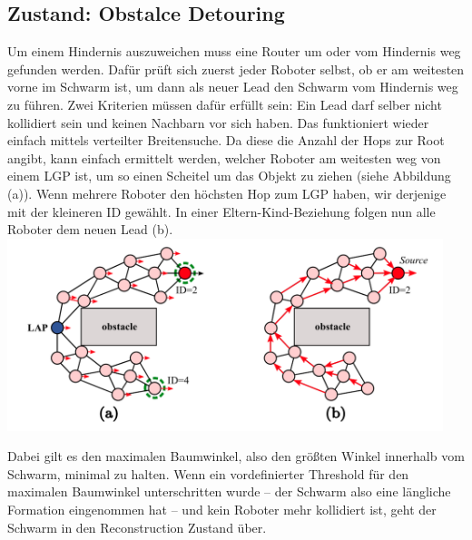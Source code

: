 \subsection{Zustand: Obstalce Detouring}

Um einem Hindernis auszuweichen muss eine Router um oder vom Hindernis weg gefunden werden. Dafür prüft
sich zuerst jeder Roboter selbst, ob er am weitesten vorne im Schwarm ist, um dann als neuer Lead den 
Schwarm vom Hindernis weg zu führen. 
Zwei Kriterien müssen dafür erfüllt sein: Ein Lead darf selber nicht kollidiert sein und keinen Nachbarn
vor sich haben.
Das funktioniert wieder einfach
mittels verteilter Breitensuche. Da diese die Anzahl der Hops zur Root angibt, kann einfach ermittelt werden,
welcher Roboter am weitesten weg von einem LGP ist, um so einen Scheitel um das Objekt zu ziehen (siehe
Abbildung (a)).
Wenn mehrere Roboter den höchsten Hop zum LGP haben, wir derjenige mit der kleineren ID
gewählt. In einer Eltern-Kind-Beziehung folgen nun alle Roboter dem neuen Lead (b).\\

\includegraphics[width=5in]{images/Screenshot 2023-02-20 at 1.25.24 PM.png}

Dabei gilt es den maximalen
Baumwinkel, also den größten Winkel innerhalb vom Schwarm, minimal zu halten. Wenn ein vordefinierter 
Threshold für den maximalen Baumwinkel unterschritten wurde – der Schwarm also eine längliche Formation
eingenommen hat – und kein Roboter mehr kollidiert ist, geht der
Schwarm in den Reconstruction Zustand über.